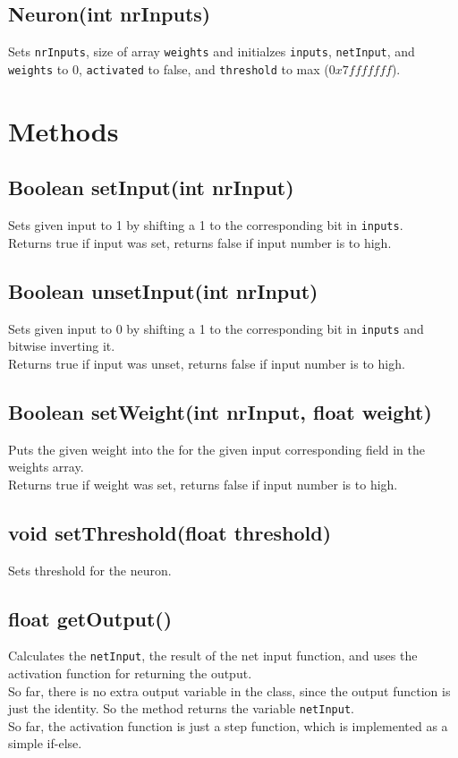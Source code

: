\subsection{Neuron(int nrInputs)}
Sets \texttt{nrInputs}, size of array \texttt{weights} and initialzes \texttt{inputs}, \texttt{netInput}, and \texttt{weights} to 0, \texttt{activated} to false, and \texttt{threshold} to max ($0x7fffffff$).

\section{Methods}
\subsection{Boolean setInput(int nrInput)}
Sets given input to 1 by shifting a 1 to the corresponding bit in \texttt{inputs}.\\
Returns true if input was set, returns false if input number is to high.

\subsection{Boolean unsetInput(int nrInput)}
Sets given input to 0 by shifting a 1 to the corresponding bit in \texttt{inputs} and bitwise inverting it.\\
Returns true if input was unset, returns false if input number is to high.

\subsection{Boolean setWeight(int nrInput, float weight)}
Puts the given weight into the for the given input corresponding field in the weights array.\\
Returns true if weight was set, returns false if input number is to high.

\subsection{void setThreshold(float threshold)}
Sets threshold for the neuron.

\subsection{float getOutput()}
Calculates the \texttt{netInput}, the result of the net input function, and uses the activation function for returning the output.\\
So far, there is no extra output variable in the class, since the output function is just the identity. So the method returns the variable \texttt{netInput}.\\
So far, the activation function is just a step function, which is implemented as a simple if-else.

